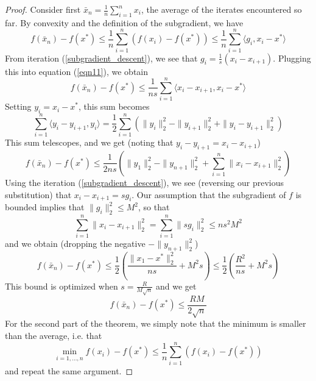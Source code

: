 \begin{proof}
 Consider first $\bar{x}_n = \frac{1}{n}\sum_{i = 1}^n x_i$, the average of the iterates encountered so
 far. By convexity and the definition of the subgradient, we have
 \begin{equation}\label{eqn11}
  f(\bar{x}_n) - f(x^*) \leq \frac{1}{n}\displaystyle\sum_{i = 1}^n (f(x_i) - f(x^*))\leq \frac{1}{n}\displaystyle\sum_{i = 1}^n 
  \langle g_i, x_i - x^*\rangle
 \end{equation}
 From iteration (\ref{subgradient_descent}), we see that $g_i = \frac{1}{s}(x_i - x_{i+1})$. Plugging this into equation
 (\ref{eqn11}), we obtain
 \begin{equation}
  f(\bar{x}_n) - f(x^*) \leq \frac{1}{ns} \displaystyle\sum_{i = 1}^n \langle x_i - x_{i+1}, x_i - x^*\rangle
 \end{equation}
 Setting $y_i = x_i - x^*$, this sum becomes
 \begin{equation}
  \displaystyle\sum_{i = 1}^n \langle y_i - y_{i+1}, y_i\rangle = \frac{1}{2}\displaystyle\sum_{i = 1}^n
  \left(\|y_i\|_2^2 - \|y_{i+1}\|_2^2 + \|y_i - y_{i+1}\|_2^2\right)
 \end{equation}
 This sum telescopes, and we get (noting that $y_i - y_{i+1} = x_i - x_{i+1}$)
 \begin{equation}
  f(\bar{x}_n) - f(x^*) \leq \frac{1}{2ns}\left(\|y_1\|_2^2 - \|y_{n+1}\|_2^2 + \displaystyle\sum_{i = 1}^n \|x_i - x_{i+1}\|_2^2\right)
 \end{equation}
 Using the iteration (\ref{subgradient_descent}), we see (reversing our previous substitution) that
 $x_i - x_{i + 1} = sg_i$. Our assumption that the subgradient of $f$ is bounded implies that $\|g_i\|_2^2 \leq M^2$,
 so that
 $$\displaystyle\sum_{i = 1}^n \|x_i - x_{i+1}\|_2^2 = \displaystyle\sum_{i = 1}^n \|sg_i\|_2^2 \leq ns^2M^2
 $$
 and we obtain (dropping the negative $-\|y_{n+1}\|_2^2$)
 \begin{equation}
  f(\bar{x}_n) - f(x^*) \leq \frac{1}{2}\left(\frac{\|x_1 - x^*\|_2^2}{ns} + M^2s\right) \leq \frac{1}{2}\left(\frac{R^2}{ns} + M^2s\right)
 \end{equation}
 This bound is optimized when $s = \frac{R}{M\sqrt{n}}$ and we get
 \begin{equation}
  f(\bar{x}_n) - f(x^*) \leq \frac{RM}{2\sqrt{n}}
 \end{equation}
 For the second part of the theorem, we simply note that the minimum is smaller than the average, i.e. that
 \begin{equation}
  \min_{i = 1,...,n} f(x_i) - f(x^*) \leq \frac{1}{n}\displaystyle\sum_{i = 1}^n (f(x_i) - f(x^*))
 \end{equation}
 and repeat the same argument.

\end{proof}

